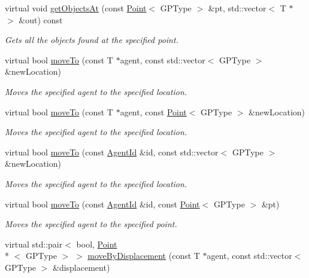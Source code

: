 \begin{DoxyCompactItemize}
virtual void \hyperlink{classrepast_1_1_base_grid_a21d840f3eb758b8f223ca51bf1996328}{get\-Objects\-At} (const \hyperlink{classrepast_1_1_point}{Point}$<$ G\-P\-Type $>$ \&pt, std\-::vector$<$ T $\ast$ $>$ \&out) const 
\begin{DoxyCompactList}\small\item\em Gets all the objects found at the specified point. \end{DoxyCompactList}\item 
virtual bool \hyperlink{classrepast_1_1_base_grid_a40e9d1d23b2e9f4e3d40d87d92595693}{move\-To} (const T $\ast$agent, const std\-::vector$<$ G\-P\-Type $>$ \&new\-Location)
\begin{DoxyCompactList}\small\item\em Moves the specified agent to the specified location. \end{DoxyCompactList}\item 
virtual bool \hyperlink{classrepast_1_1_base_grid_a60f5499f55a0736c07ed87bb37caeae8}{move\-To} (const T $\ast$agent, const \hyperlink{classrepast_1_1_point}{Point}$<$ G\-P\-Type $>$ \&new\-Location)
\begin{DoxyCompactList}\small\item\em Moves the specified agent to the specified location. \end{DoxyCompactList}\item 
virtual bool \hyperlink{classrepast_1_1_base_grid_a3a39996218f4426aa1b2f081d3b44eb4}{move\-To} (const \hyperlink{classrepast_1_1_agent_id}{Agent\-Id} \&id, const std\-::vector$<$ G\-P\-Type $>$ \&new\-Location)
\begin{DoxyCompactList}\small\item\em Moves the specified agent to the specified location. \end{DoxyCompactList}\item 
virtual bool \hyperlink{classrepast_1_1_base_grid_a9f3dbdfe875327dbcc069971de98bc83}{move\-To} (const \hyperlink{classrepast_1_1_agent_id}{Agent\-Id} \&id, const \hyperlink{classrepast_1_1_point}{Point}$<$ G\-P\-Type $>$ \&pt)
\begin{DoxyCompactList}\small\item\em Moves the specified agent to the specified point. \end{DoxyCompactList}\item 
virtual std\-::pair$<$ bool, \hyperlink{classrepast_1_1_point}{Point}\\*
$<$ G\-P\-Type $>$ $>$ \hyperlink{classrepast_1_1_base_grid_a75758e9f795679c0a9c9b92fbd9413af}{move\-By\-Displacement} (const T $\ast$agent, const std\-::vector$<$ G\-P\-Type $>$ \&displacement)

\end{DoxyCompactItemize}

